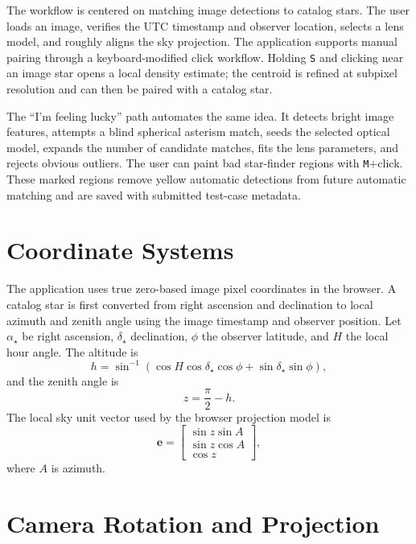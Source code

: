 \documentclass[11pt]{article}
\begin{document}
The workflow is centered on matching image detections to catalog stars. The user
loads an image, verifies the UTC timestamp and observer location, selects a
lens model, and roughly aligns the sky projection. The application supports
manual pairing through a keyboard-modified click workflow. Holding \texttt{S}
and clicking near an image star opens a local density estimate; the centroid is
refined at subpixel resolution and can then be paired with a catalog star.

The ``I'm feeling lucky'' path automates the same idea. It detects bright image
features, attempts a blind spherical asterism match, seeds the selected optical
model, expands the number of candidate matches, fits the lens parameters, and
rejects obvious outliers. The user can paint bad star-finder regions with
\texttt{M}+click. These marked regions remove yellow automatic detections from
future automatic matching and are saved with submitted test-case metadata.

\section{Coordinate Systems}

The application uses true zero-based image pixel coordinates in the browser. A
catalog star is first converted from right ascension and declination to local
azimuth and zenith angle using the image timestamp and observer position. Let
\(\alpha_\star\) be right ascension, \(\delta_\star\) declination, \(\phi\) the
observer latitude, and \(H\) the local hour angle. The altitude is
\begin{equation}
  h = \sin^{-1}\left(\cos H \cos\delta_\star \cos\phi
      + \sin\delta_\star \sin\phi\right),
\end{equation}
and the zenith angle is
\begin{equation}
  z = \frac{\pi}{2} - h.
\end{equation}
The local sky unit vector used by the browser projection model is
\begin{equation}
  \mathbf{e} =
  \begin{bmatrix}
    \sin z \sin A \\
    \sin z \cos A \\
    \cos z
  \end{bmatrix},
\end{equation}
where \(A\) is azimuth.

\section{Camera Rotation and Projection}
\end{document}
